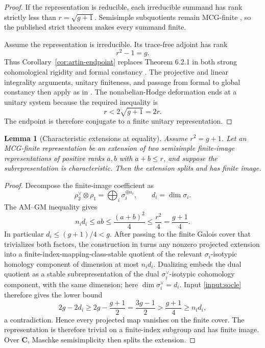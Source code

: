 \documentclass[11pt]{article}
\newtheorem{lemma}[theorem]{Lemma}
\theoremstyle{definition}
\newcommand{\C}{\mathbf C}
\begin{document}
\begin{proof}
If the representation is reducible, each irreducible summand has rank
strictly less than $r=\sqrt{g+1}$.  Semisimple subquotients remain
MCG-finite \cite[Proposition~2.1.1]{LLCan}, so the published strict theorem
makes every summand finite.

Assume the representation is irreducible.  Its trace-free adjoint has rank
\[
 r^2-1=g.
\]
Thus Corollary~\ref{cor:artin-endpoint} replaces Theorem 6.2.1 in both strong
cohomological rigidity \cite[Proposition~8.2.1]{LLCan} and formal constancy
\cite[Lemma~8.5.1]{LLCan}.  The projective and linear integrality arguments,
unitary finiteness, and passage from formal to global constancy then apply as
in \cite[Sections~8.3--8.5]{LLCan}.  The nonabelian-Hodge deformation ends
at a unitary system because the required inequality is
\[
 r<2\sqrt{g+1}=2r.
\]
The endpoint is therefore conjugate to a finite unitary representation.
\end{proof}

\begin{lemma}[Characteristic extensions at equality]
\label{lem:extensions}
Assume $r^2=g+1$.  Let an MCG-finite representation be an extension of two
semisimple finite-image representations of positive ranks $a,b$ with
$a+b\le r$, and suppose the subrepresentation is characteristic.  Then the
extension splits and has finite image.
\end{lemma}

\begin{proof}
Decompose the finite-image coefficient as
\[
 \rho_2^\vee\otimes\rho_1
 =\bigoplus_i\sigma_i^{\oplus n_i},
 \qquad d_i=\dim\sigma_i.
\]
The AM--GM inequality gives
\[
 n_i d_i\le ab
 \le\frac{(a+b)^2}{4}
 \le\frac{r^2}{4}
 =\frac{g+1}{4}.
\]
In particular $d_i\le(g+1)/4<g$.  After passing to the finite Galois cover
that trivializes both factors, the construction in
\cite[Lemma~8.6.1]{LLCan} turns any nonzero projected extension into a
finite-index-mapping-class-stable quotient of the relevant
$\sigma_i$-isotypic homology component of dimension at most $n_i d_i$.
Dualizing embeds the dual quotient as a stable subrepresentation of the
dual $\sigma_i^\vee$-isotypic cohomology component, with the same dimension;
here $\dim\sigma_i^\vee=d_i$.  Input \ref{input:socle} therefore gives the
lower bound
\[
 2g-2d_i
 \ge 2g-\frac{g+1}{2}
 =\frac{3g-1}{2}
 >\frac{g+1}{4}
 \ge n_i d_i,
\]
a contradiction.  Hence every projected map vanishes on the finite cover.
The representation is therefore trivial on a finite-index subgroup and has
finite image.  Over $\C$, Maschke semisimplicity then splits the extension.
\end{proof}
\end{document}
